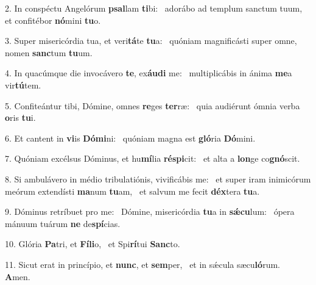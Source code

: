 2. In conspéctu Angelórum \textbf{psal}lam \textbf{ti}bi: \ast\  adorábo ad templum sanctum tuum, et confitébor \textbf{nó}mini \textbf{tu}o.\

3. Super misericórdia tua, et veri\textbf{tá}te \textbf{tu}a: \ast\  quóniam magnificásti super omne, nomen \textbf{sanc}tum \textbf{tu}um.\

4. In quacúmque die invocávero \textbf{te}, ex\textbf{áu}\textbf{di} me: \ast\  multiplicábis in ánima \textbf{me}a vir\textbf{tú}tem.\

5. Confiteántur tibi, Dómine, omnes \textbf{re}ges \textbf{ter}ræ: \ast\  quia audiérunt ómnia verba \textbf{o}ris \textbf{tu}i.\

6. Et cantent in \textbf{vi}is \textbf{Dó}\textbf{mi}ni: \ast\  quóniam magna est \textbf{gló}ria \textbf{Dó}mini.\

7. Quóniam excélsus Dóminus, et hu\textbf{mí}lia \textbf{ré}\textbf{spi}cit: \ast\  et alta a \textbf{lon}ge co\textbf{gnó}scit.\

8. Si ambulávero in médio tribulatiónis, vivificábis me: \dag\  et super iram inimicórum meórum extendísti \textbf{ma}num \textbf{tu}am, \ast\  et salvum me fecit \textbf{déx}tera \textbf{tu}a.\

9. Dóminus retríbuet pro me: \dag\  Dómine, misericórdia \textbf{tu}a in \textbf{sǽ}\textbf{cu}lum: \ast\  ópera mánuum tuárum \textbf{ne} de\textbf{spí}cias.\

10. Glória \textbf{Pa}tri, et \textbf{Fí}\textbf{li}o, \ast\  et Spi\textbf{rí}tui \textbf{Sanc}to.\

11. Sicut erat in princípio, et \textbf{nunc}, et \textbf{sem}per, \ast\  et in sǽcula sæcu\textbf{ló}rum. \textbf{A}men.\

